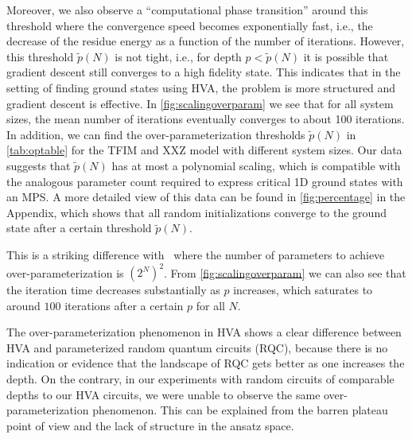 \documentclass[
 aps,
 pra,
 showpacs,
 showkeys,
 superscriptaddress,
 reprint,%
twocolumn,
]{revtex4-1}
\begin{document}
Moreover, we also observe a ``computational phase transition'' around this threshold where the convergence speed becomes exponentially fast, i.e., the decrease of the residue energy as a function of the number of iterations. However, this threshold $\tilde{p}(N)$ is not tight, i.e., for depth $p<\tilde{p}(N)$ it is possible that gradient descent still converges to a high fidelity state. This indicates that in the setting of finding ground states using HVA, the problem is more structured and gradient descent is effective. In \cref{fig:scalingoverparam} we see that for all system sizes, the mean number of iterations eventually converges to about 100 iterations. In addition, we can find the over-parameterization thresholds $\tilde{p}(N)$ in \cref{tab:optable} for the TFIM and XXZ model with different system sizes. Our data suggests that $\tilde{p}(N)$ has at most a polynomial scaling, which is compatible with the analogous parameter count required to express critical 1D ground states with an MPS. A more detailed view of this data can be found in \cref{fig:percentage} in the Appendix, which shows that all random initializations converge to the ground state after a certain threshold $\tilde{p}(N)$.

This is a striking difference with~\cite{kiani2020learning} where the number of parameters to achieve over-parameterization is $(2^{N})^2$. From \cref{fig:scalingoverparam} we can also see that the iteration time decreases substantially as $p$ increases, which saturates to around $100$ iterations after a certain $p$ for all $N$.

The over-parameterization phenomenon in HVA shows a clear difference between HVA and parameterized random quantum circuits (RQC), because there is no indication or evidence that the landscape of RQC gets better as one increases the depth. On the contrary, in our experiments with random circuits of comparable depths to our HVA circuits, we were unable to observe the same  over-parameterization phenomenon. This can be explained from the barren plateau point of view and the lack of structure in the ansatz space.
\end{document}
